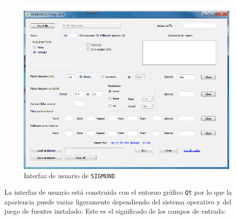 \begin{figure}[h!]
\centering
\includegraphics[scale=1]{ManFigs/sigmund_ui.png}
\caption{Interfaz de usuario de \texttt{SIGMUND} }
\label{fig:ASIGMUNDMAN_sigmund_ui}
\end{figure}

La interfaz de usuario está construida con el entorno gráfico \texttt{Qt} por lo que la apariencia puede variar ligeramente dependiendo del sistema operativo y del juego de fuentes instalado. Este es el significado de los campos de entrada:

